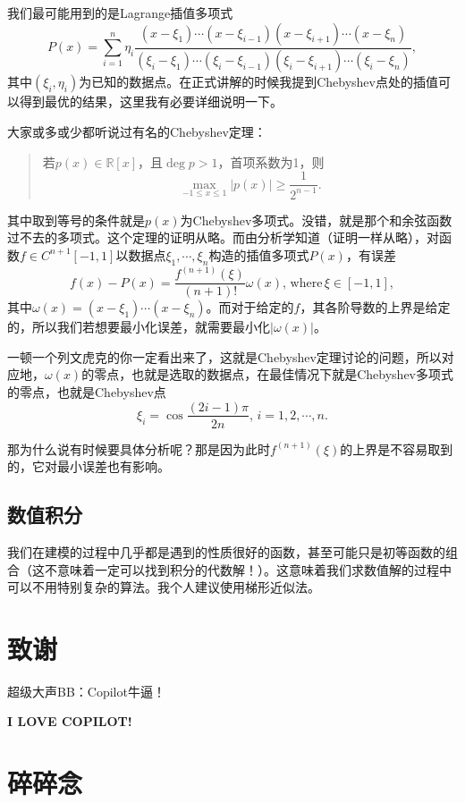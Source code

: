\documentclass[a4paper, 12pt]{article}
\begin{document}
    我们最可能用到的是Lagrange插值多项式
    \[
    P(x)=\sum_{i=1}^{n}\eta_i\frac{(x-\xi_1)\cdots(x-\xi_{i-1})(x-\xi_{i+1})\cdots(x-\xi_n)}{(\xi_i-\xi_1)\cdots(\xi_i-\xi_{i-1})(\xi_i-\xi_{i+1})\cdots(\xi_i-\xi_n)},
    \]
    其中$(\xi_i,\eta_i)$为已知的数据点。在正式讲解的时候我提到Chebyshev点处的插值可以得到最优的结果，这里我有必要详细说明一下。

    大家或多或少都听说过有名的Chebyshev定理：
    \begin{quotation}
        若$p(x)\in\mathbb R[x]$，且$\deg p>1$，首项系数为1，则
        \[
        \max_{-1\leq x\leq 1}|p(x)|\geq\frac{1}{2^{n-1}}.
        \]
    \end{quotation}
    其中取到等号的条件就是$p(x)$为Chebyshev多项式。没错，就是那个和余弦函数过不去的多项式。这个定理的证明从略。而由分析学知道（证明一样从略），对函数$f\in C^{n+1}[-1,1]$以数据点$\xi_1,\cdots,\xi_n$构造的插值多项式$P(x)$，有误差
    \[
    f(x)-P(x)=\frac{f^{(n+1)}(\xi)}{(n+1)!}\omega(x),\,\mathrm{where}\,\xi\in[-1,1],
    \]
    其中$\omega(x)=(x-\xi_1)\cdots(x-\xi_n)$。而对于给定的$f$，其各阶导数的上界是给定的，所以我们若想要最小化误差，就需要最小化$|\omega(x)|$。

    一顿一个列文虎克的你一定看出来了，这就是Chebyshev定理讨论的问题，所以对应地，$\omega(x)$的零点，也就是选取的数据点，在最佳情况下就是Chebyshev多项式的零点，也就是Chebyshev点
    \[
    \xi_i=\cos\frac{(2i-1)\pi}{2n},\,i=1,2,\cdots,n.
    \]

    那为什么说有时候要具体分析呢？那是因为此时$f^{(n+1)}(\xi)$的上界是不容易取到的，它对最小误差也有影响。

    \subsection{数值积分}

    我们在建模的过程中几乎都是遇到的性质很好的函数，甚至可能只是初等函数的组合（这不意味着一定可以找到积分的代数解！）。这意味着我们求数值解的过程中可以不用特别复杂的算法。我个人建议使用梯形近似法。

    \section{致谢}

    超级大声BB：Copilot牛逼！

    \textbf{I LOVE COPILOT!}

    \section{碎碎念}
\end{document}
